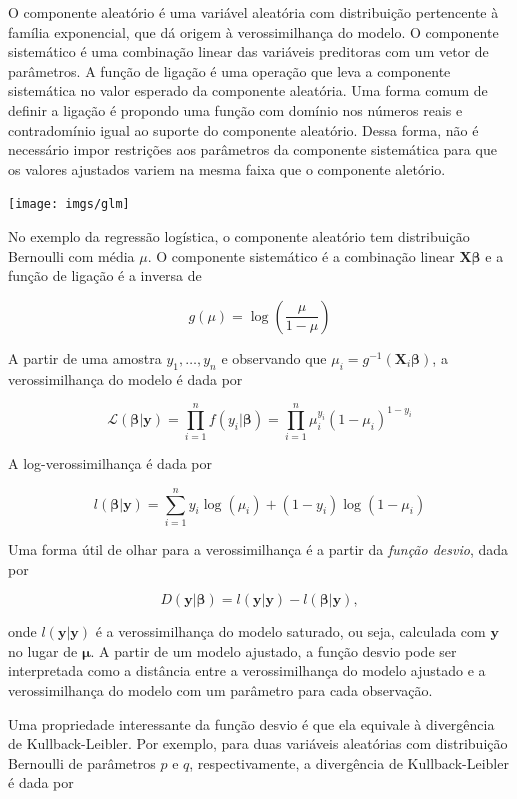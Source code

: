 \documentclass[12pt,]{report}
\begin{document}
O componente aleatório é uma variável aleatória com distribuição
pertencente à família exponencial, que dá origem à verossimilhança do
modelo. O componente sistemático é uma combinação linear das variáveis
preditoras com um vetor de parâmetros. A função de ligação é uma
operação que leva a componente sistemática no valor esperado da
componente aleatória. Uma forma comum de definir a ligação é propondo
uma função com domínio nos números reais e contradomínio igual ao
suporte do componente aleatório. Dessa forma, não é necessário impor
restrições aos parâmetros da componente sistemática para que os valores
ajustados variem na mesma faixa que o componente aletório.

\begin{center}\texttt{[image: imgs/glm]} \end{center}

No exemplo da regressão logística, o componente aleatório tem
distribuição Bernoulli com média \(\mu\). O componente sistemático é a
combinação linear \(\mathbf X \boldsymbol \beta\) e a função de ligação
é a inversa de

\[
g(\mu) = \log\left(\frac{\mu}{1-\mu}\right)
\]

A partir de uma amostra \(y_1, \dots, y_n\) e observando que
\(\mu_i = g^{-1}(\mathbf X_i\boldsymbol\beta)\), a verossimilhança do
modelo é dada por

\[
\mathcal L(\boldsymbol \beta|\mathbf y) = \prod_{i=1}^n f(y_i|\boldsymbol\beta) = \prod_{i=1}^n\mu_i^{y_i}(1-\mu_i)^{1-y_i}
\]

A log-verossimilhança é dada por

\[
l(\boldsymbol \beta|\mathbf y) = \sum_{i=1}^n y_i\log(\mu_i) + (1-y_i)\log(1-\mu_i)
\]

Uma forma útil de olhar para a verossimilhança é a partir da
\emph{função desvio}, dada por

\[
D(\mathbf y|\boldsymbol \beta) = l(\mathbf y|\mathbf y) - l(\boldsymbol \beta|\mathbf y),
\]

onde \(l(\mathbf y|\mathbf y)\) é a verossimilhança do modelo saturado,
ou seja, calculada com \(\mathbf y\) no lugar de \(\boldsymbol \mu\). A
partir de um modelo ajustado, a função desvio pode ser interpretada como
a distância entre a verossimilhança do modelo ajustado e a
verossimilhança do modelo com um parâmetro para cada observação.

Uma propriedade interessante da função desvio é que ela equivale à
divergência de Kullback-Leibler. Por exemplo, para duas variáveis
aleatórias com distribuição Bernoulli de parâmetros \(p\) e \(q\),
respectivamente, a divergência de Kullback-Leibler é dada por
\end{document}

